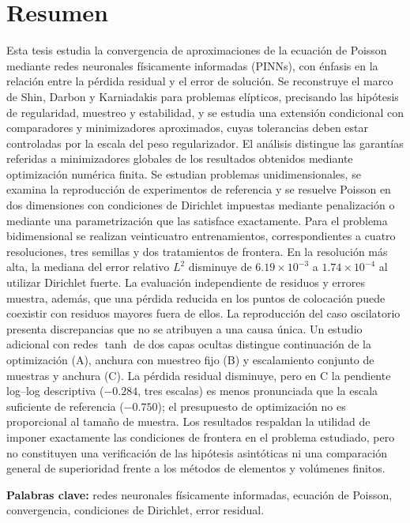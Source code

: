 \chapter*{\centering \large Resumen}

Esta tesis estudia la convergencia de aproximaciones de la ecuación de Poisson mediante redes neuronales físicamente informadas (PINNs), con énfasis en la relación entre la pérdida residual y el error de solución. Se reconstruye el marco de Shin, Darbon y Karniadakis para problemas elípticos, precisando las hipótesis de regularidad, muestreo y estabilidad, y se estudia una extensión condicional con comparadores y minimizadores aproximados, cuyas tolerancias deben estar controladas por la escala del peso regularizador. El análisis distingue las garantías referidas a minimizadores globales de los resultados obtenidos mediante optimización numérica finita. Se estudian problemas unidimensionales, se examina la reproducción de experimentos de referencia y se resuelve Poisson en dos dimensiones con condiciones de Dirichlet impuestas mediante penalización o mediante una parametrización que las satisface exactamente. Para el problema bidimensional se realizan veinticuatro entrenamientos, correspondientes a cuatro resoluciones, tres semillas y dos tratamientos de frontera. En la resolución más alta, la mediana del error relativo $L^2$ disminuye de $6.19\times10^{-3}$ a $1.74\times10^{-4}$ al utilizar Dirichlet fuerte. La evaluación independiente de residuos y errores muestra, además, que una pérdida reducida en los puntos de colocación puede coexistir con residuos mayores fuera de ellos. La reproducción del caso oscilatorio presenta discrepancias que no se atribuyen a una causa única. Un estudio adicional con redes $\tanh$ de dos capas ocultas distingue continuación de la optimización (A), anchura con muestreo fijo (B) y escalamiento conjunto de muestras y anchura (C). La pérdida residual disminuye, pero en C la pendiente log--log descriptiva ($-0.284$, tres escalas) es menos pronunciada que la escala suficiente de referencia ($-0.750$); el presupuesto de optimización no es proporcional al tamaño de muestra. Los resultados respaldan la utilidad de imponer exactamente las condiciones de frontera en el problema estudiado, pero no constituyen una verificación de las hipótesis asintóticas ni una comparación general de superioridad frente a los métodos de elementos y volúmenes finitos.

\noindent\textbf{Palabras clave:} redes neuronales físicamente informadas, ecuación de Poisson, convergencia, condiciones de Dirichlet, error residual.

